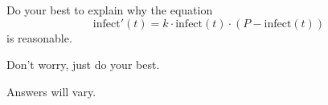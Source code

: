 \documentclass{ximera}
\begin{document}
\begin{problem}
  Do your best to explain why the equation
  \[
  \mathrm{infect}'(t) = k\cdot \mathrm{infect}(t)\cdot (P-\mathrm{infect}(t))
  \]
  is reasonable.
  \begin{hint}
    Don't worry, just do your best.
  \end{hint}
  \begin{freeResponse}
    Answers will vary.
  \end{freeResponse}
\end{problem}

%
\end{document}
